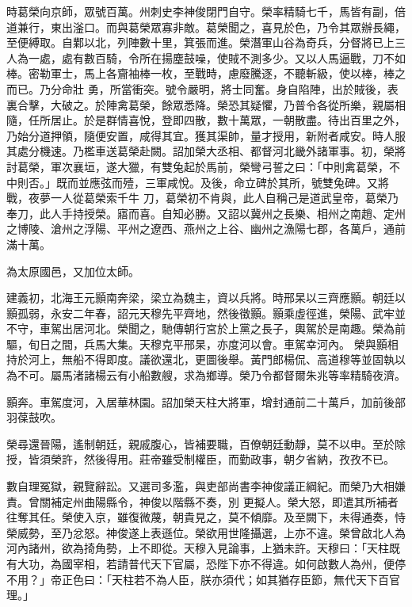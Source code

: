 \begin{pinyinscope}
 時葛榮向京師，眾號百萬。州刺史李神俊閉門自守。榮率精騎七千，馬皆有副，倍道兼行，東出滏口。而與葛榮眾寡非敵。葛榮聞之，喜見於色，乃令其眾辦長繩，至便縛取。自鄴以北，列陣數十里，箕張而進。榮潛軍山谷為奇兵，分督將已上三人為一處，處有數百騎，令所在揚塵鼓噪，使賊不測多少。又以人馬逼戰，刀不如棒。密勒軍士，馬上各齎袖棒一枚，至戰時，慮廢騰逐，不聽斬級，使以棒，棒之而已。乃分命壯
 勇，所當衝突。號令嚴明，將士同奮。身自陷陣，出於賊後，表裏合擊，大破之。於陣禽葛榮，餘眾悉降。榮恐其疑懼，乃普令各從所樂，親屬相隨，任所居止。於是群情喜悅，登即四散，數十萬眾，一朝散盡。待出百里之外，乃始分道押領，隨便安置，咸得其宜。獲其渠帥，量才授用，新附者咸安。時人服其處分機速。乃檻車送葛榮赴闕。詔加榮大丞相、都督河北畿外諸軍事。初，榮將討葛榮，軍次襄垣，遂大獵，有雙兔起於馬前，榮彎弓誓之曰：「中則禽葛榮，不中則否。」既而並應弦而殪，三軍咸悅。及後，命立碑於其所，號雙兔碑。又將戰，夜夢一人從葛榮索千牛
 刀，葛榮初不肯與，此人自稱己是道武皇帝，葛榮乃奉刀，此人手持授榮。寤而喜。自知必勝。又詔以冀州之長樂、相州之南趙、定州之博陵、滄州之浮陽、平州之遼西、燕州之上谷、幽州之漁陽七郡，各萬戶，通前滿十萬。



 為太原國邑，又加位太師。



 建義初，北海王元顥南奔梁，梁立為魏主，資以兵將。時邢杲以三齊應顥。朝廷以顥孤弱，永安二年春，詔元天穆先平齊地，然後徵顥。顥乘虛徑進，榮陽、武牢並不守，車駕出居河北。榮聞之，馳傳朝行宮於上黨之長子，輿駕於是南趣。榮為前驅，旬日之間，兵馬大集。天穆克平邢杲，亦度河以會。車駕幸河內。
 榮與顥相持於河上，無船不得即度。議欲還北，更圖後舉。黃門郎楊侃、高道穆等並固執以為不可。屬馬渚諸楊云有小船數艘，求為鄉導。榮乃令都督爾朱兆等率精騎夜濟。



 顥奔。車駕度河，入居華林園。詔加榮天柱大將軍，增封通前二十萬戶，加前後部羽葆鼓吹。



 榮尋還晉陽，遙制朝廷，親戚腹心，皆補要職，百僚朝廷動靜，莫不以申。至於除授，皆須榮許，然後得用。莊帝雖受制權臣，而勤政事，朝夕省納，孜孜不已。



 數自理冤獄，親覽辭訟。又選司多濫，與吏部尚書李神俊議正綱紀。而榮乃大相嫌責。曾關補定州曲陽縣令，神俊以階縣不奏，別
 更擬人。榮大怒，即遣其所補者往奪其任。榮使入京，雖復微蔑，朝貴見之，莫不傾靡。及至闕下，未得通奏，恃榮威勢，至乃忿怒。神俊遂上表遜位。榮欲用世隆攝選，上亦不違。榮曾啟北人為河內諸州，欲為掎角勢，上不即從。天穆入見論事，上猶未許。天穆曰：「天柱既有大功，為國宰相，若請普代天下官屬，恐陛下亦不得違。如何啟數人為州，便停不用？」帝正色曰：「天柱若不為人臣，朕亦須代；如其猶存臣節，無代天下百官理。」




\end{pinyinscope}
